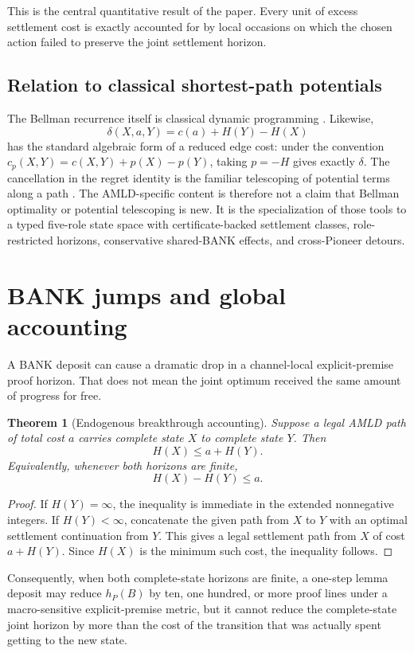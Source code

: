 \documentclass[11pt]{article}
\newtheorem{theorem}[definition]{Theorem}
\theoremstyle{remark}
\begin{document}
This is the central quantitative result of the paper. Every unit of excess settlement cost is exactly accounted for by local occasions on which the chosen action failed to preserve the joint settlement horizon.

\subsection{Relation to classical shortest-path potentials}
The Bellman recurrence itself is classical dynamic programming \cite{Bellman1957}. Likewise,
\[
\delta(X,a,Y)=c(a)+H(Y)-H(X)
\]
has the standard algebraic form of a reduced edge cost: under the convention $c_p(X,Y)=c(X,Y)+p(X)-p(Y)$, taking $p=-H$ gives exactly $\delta$. The cancellation in the regret identity is the familiar telescoping of potential terms along a path \cite{MITJohnson}. The AMLD-specific content is therefore not a claim that Bellman optimality or potential telescoping is new. It is the specialization of those tools to a typed five-role state space with certificate-backed settlement classes, role-restricted horizons, conservative shared-BANK effects, and cross-Pioneer detours.

\section{BANK jumps and global accounting}

A BANK deposit can cause a dramatic drop in a channel-local explicit-premise proof horizon. That does not mean the joint optimum received the same amount of progress for free.

\begin{theorem}[Endogenous breakthrough accounting]
Suppose a legal AMLD path of total cost $a$ carries complete state $X$ to complete state $Y$. Then
\[
H(X)\le a+H(Y).
\]
Equivalently, whenever both horizons are finite,
\[
\boxed{H(X)-H(Y)\le a.}
\]
\end{theorem}
\begin{proof}
If $H(Y)=\infty$, the inequality is immediate in the extended nonnegative integers. If $H(Y)<\infty$, concatenate the given path from $X$ to $Y$ with an optimal settlement continuation from $Y$. This gives a legal settlement path from $X$ of cost $a+H(Y)$. Since $H(X)$ is the minimum such cost, the inequality follows.
\end{proof}

Consequently, when both complete-state horizons are finite, a one-step lemma deposit may reduce $h_P(B)$ by ten, one hundred, or more proof lines under a macro-sensitive explicit-premise metric, but it cannot reduce the complete-state joint horizon by more than the cost of the transition that was actually spent getting to the new state.
\end{document}
